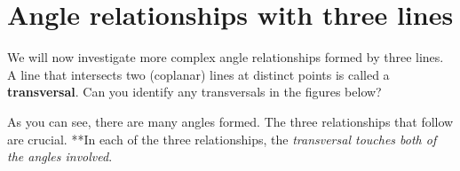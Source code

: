 \begin{exercises}
\begin{ex}
\begin{exparts}
	\end{exparts}
	\begin{sol}
\end{sol}
\end{ex}

\end{exercises}	

\section{Angle relationships with three lines}
\label{sec:parallel-angle-relationships}

We will now investigate more complex angle relationships formed by three lines.  A line that intersects two (coplanar) lines at distinct points is called a \textbf{transversal}.  \q Can you identify any transversals in the figures below?

\vfill

	\hfill
	
\smallskip	
	
As you can see, there are many angles formed. 
The three relationships that follow are crucial.  **In each of the three relationships, the \emph{transversal touches both of the angles involved}.

